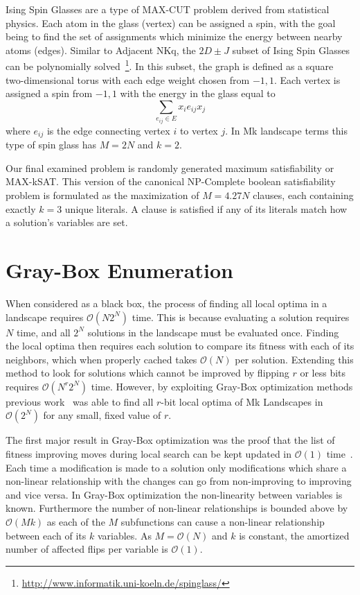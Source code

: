 \documentclass[runningheads,a4paper]{llncs}
\newcommand{\BigO}[1]{$\mathcal{O}{(#1)}$}
\begin{document}
Ising Spin Glasses are a type of MAX-CUT problem derived from statistical physics.
Each atom in the glass (vertex) can be assigned a spin, with the goal being to
find the set of assignments which minimize the energy between nearby atoms (edges).
Similar to Adjacent NKq, the $2D\pm J$ subset of Ising Spin Glasses can be polynomially
solved~\cite{saul:1994:spinglass}\footnote{\url{http://www.informatik.uni-koeln.de/spinglass/}}.
In this subset, the graph is defined as a square two-dimensional torus with each edge
weight chosen from ${-1, 1}$. Each vertex is assigned a spin from ${-1, 1}$ with
the energy in the glass equal to
\begin{equation}
\sum_{e_{ij} \in E} x_ie_{ij}x_j
  \label{eq-ising}
\end{equation}
where $e_{ij}$ is the edge connecting vertex $i$ to vertex $j$. In Mk landscape terms
this type of spin glass has $M=2N$ and $k=2$.

Our final examined problem is randomly generated maximum satisfiability or MAX-kSAT.
This version of the canonical NP-Complete boolean satisfiability problem is formulated
as the maximization of $M=4.27N$ clauses, each containing exactly $k=3$ unique literals.
A clause is satisfied if any of its literals match how a solution's variables are set.

\section{Gray-Box Enumeration}
When considered as a black box, the process of finding all local optima
in a landscape requires \BigO{N2^N} time. This is because evaluating
a solution requires $N$ time, and all $2^N$ solutions in the landscape
must be evaluated once. Finding the local
optima then requires each solution to compare its fitness with each
of its neighbors, which when properly cached takes \BigO{N} per solution.
Extending this method to look for solutions which cannot be improved by
flipping $r$ or less bits requires \BigO{N^r2^N} time. However,
by exploiting Gray-Box optimization methods previous work~\cite{ochoa:2015:crossovernetworks}
was able to find all $r$-bit local optima of Mk Landscapes in \BigO{2^N} for any small,
fixed value of $r$.

The first major result in Gray-Box optimization was the proof that the list
of fitness improving moves during local search can be kept updated in \BigO{1}
time~\cite{whitley:2012:constant}. Each time a modification is made to a solution
only modifications which share a non-linear relationship with the changes can
go from non-improving to improving and vice versa. In Gray-Box optimization
the non-linearity between variables is known. Furthermore the number of
non-linear relationships is bounded above by \BigO{Mk} as each of the $M$
subfunctions can cause a non-linear relationship between each of its $k$
variables. As $M=$\BigO{N} and $k$ is constant, the amortized number of affected
flips per variable is \BigO{1}.
\end{document}
